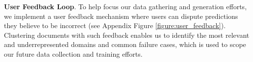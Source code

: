 \documentclass[11pt]{article}
\begin{document}




\textbf{User Feedback Loop}. To help focus our data gathering and generation efforts, we implement a user feedback mechanism where users can dispute predictions they believe to be incorrect (see Appendix Figure \ref{figure:user_feedback}). 
Clustering documents with such feedback enables us to identify the most relevant and underrepresented domains and common failure cases, which is used to scope our future data collection and training efforts.
\end{document}
